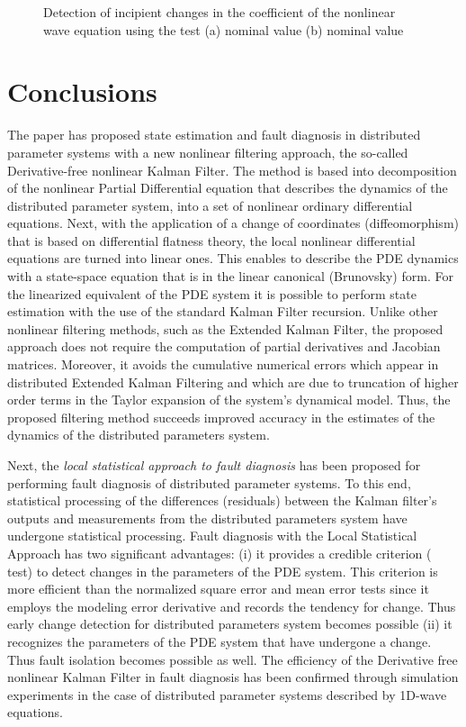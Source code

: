 \documentclass[journal]{IEEEtran}
\begin{document}
\begin{figure} [htb]
\begin{center}

\end{center}
\caption{Detection of incipient changes in the coefficient  of the nonlinear wave equation using the  test (a) nominal value   (b)  nominal value }
\label{fig: global_chi2_test}
\end{figure}


\section{Conclusions} \label{Section 7: Conclusions}

\noindent The paper has proposed state estimation and fault diagnosis in distributed parameter systems with a new nonlinear filtering approach, the so-called Derivative-free nonlinear Kalman Filter. The method is based into decomposition of the nonlinear Partial Differential equation that describes the dynamics of the distributed parameter system, into a set of nonlinear ordinary differential equations. Next, with the application of a change of coordinates (diffeomorphism) that is based on differential flatness theory, the local nonlinear differential equations are turned into linear ones. This enables to describe the PDE dynamics with a state-space equation that is in the linear canonical (Brunovsky) form. For the linearized equivalent of the PDE system it is possible to perform state estimation with the use of the standard Kalman Filter recursion. Unlike other nonlinear filtering methods, such as the Extended Kalman Filter, the proposed approach does not require the computation of partial derivatives and Jacobian matrices. Moreover, it avoids the cumulative numerical errors which appear in distributed Extended Kalman Filtering and which are due to truncation of higher order terms in the Taylor expansion of the system's dynamical model. Thus, the proposed filtering method succeeds improved accuracy in the estimates of the dynamics of the distributed parameters system.

\noindent Next, the \textit{local statistical approach to fault diagnosis} has been proposed for performing fault diagnosis of distributed parameter systems. To this end, statistical processing of the differences (residuals) between the Kalman filter's outputs and measurements from the distributed parameters system have undergone statistical processing. Fault diagnosis with the Local Statistical Approach has two significant advantages: (i) it provides a credible criterion ( test) to detect changes in the parameters of the PDE system. This criterion is more efficient than the normalized square error and mean error tests since it employs the modeling error derivative and records the tendency for change. Thus early change detection for distributed parameters system becomes possible (ii) it recognizes the parameters of the PDE system that have undergone a change. Thus fault isolation becomes possible as well. The efficiency of the Derivative free nonlinear Kalman Filter in fault diagnosis  has been confirmed through simulation experiments in the case of distributed parameter systems described by 1D-wave equations.
\end{document}
